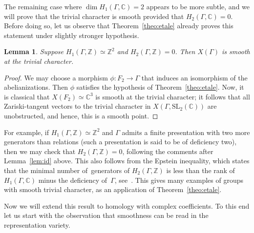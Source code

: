 \documentclass[11pt]{article}
\newtheorem{lemma}[theorem]{Lemma}
\theoremstyle{definition}
\newcommand{\ZZ}{\mathbb{Z}}
\newcommand{\CC}{\mathbb{C}}
\newcommand{\SL}{\mathrm{SL}}
\begin{document}
The remaining case where $\dim H_1(\Gamma,\CC)=2$ appears to be more subtle,
and we will prove that the trivial character is smooth provided that
$H_2(\Gamma,\CC)=0$. Before doing so, let us observe that
Theorem~\ref{theo:etale} already proves this statement under slightly
stronger hypothesis.
\begin{lemma}
Suppose $H_1(\Gamma,\ZZ)\simeq\ZZ^2$ and $H_2(\Gamma,\ZZ)=0$.
Then $X(\Gamma)$ is smooth at the trivial character.
\end{lemma}
\begin{proof}
We may choose a morphism $\phi\colon F_2\to\Gamma$ that induces an
isomorphism of the abelianizations. Then $\phi$ satisfies the hypothesis
of Theorem~\ref{theo:etale}. Now, it is classical that $X(F_2)\simeq\CC^3$
is smooth at the trivial character; it follows that all Zariski-tangent
vectors to the trivial character in $X(\Gamma,\SL_2(\CC))$ are unobstructed,
and hence, this is a smooth point.
\end{proof}
For example, if $H_1(\Gamma,\ZZ)\simeq\ZZ^2$ and $\Gamma$ admits a finite
presentation with two more generators than relations (such a presentation
is said to be of deficiency two), then we may check that $H_2(\Gamma,\ZZ)=0$,
following the comments after Lemma~\ref{lem:id} above.
This also follows from the Epstein inequality, which
states
that the minimal \hbox{number} of~\hbox{generators} of $H_2(\Gamma,\ZZ)$ is less than the
rank of $H_1(\Gamma,\CC)$ minus the deficiency of~$\Gamma$, see~\cite{Epstein}.
This gives many examples of groups with smooth trivial character, as an
application of Theorem~\ref{theo:etale}.

Now we will extend this result to homology with complex coefficients. To this
end let us start with the observation that smoothness can be read in the
representation variety.
\end{document}

